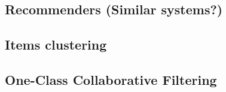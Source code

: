 










\subsection{Recommenders (Similar systems?)}
\subsection{Items clustering}
\subsection{One-Class Collaborative Filtering}

